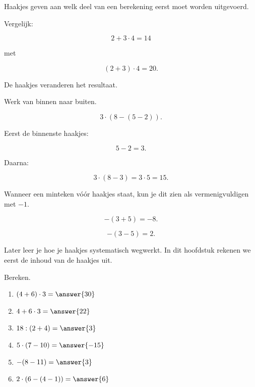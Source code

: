 \documentclass{ximera}
\begin{document}

Haakjes geven aan welk deel van een berekening eerst moet worden uitgevoerd.

\begin{example}
Vergelijk:

\[
2+3\cdot4=14
\]

met

\[
(2+3)\cdot4=20.
\]

De haakjes veranderen het resultaat.
\end{example}


Werk van binnen naar buiten.

\begin{example}
\[
3\cdot\left(8-(5-2)\right).
\]

Eerst de binnenste haakjes:

\[
5-2=3.
\]

Daarna:

\[
3\cdot(8-3)
=
3\cdot5
=
15.
\]
\end{example}


Wanneer een minteken vóór haakjes staat, kun je dit zien als vermenigvuldigen
met $-1$.

\[
-(3+5)=-8.
\]

\[
-(3-5)=2.
\]

Later leer je hoe je haakjes systematisch wegwerkt. In dit hoofdstuk rekenen we
eerst de inhoud van de haakjes uit.

\begin{exercise}
Bereken.

\begin{enumerate}
    \item $(4+6)\cdot3=\answer{30}$
    \item $4+6\cdot3=\answer{22}$
    \item $18:(2+4)=\answer{3}$
    \item $5\cdot(7-10)=\answer{-15}$
    \item $-(8-11)=\answer{3}$
    \item $2\cdot(6-(4-1))=\answer{6}$
\end{enumerate}
\end{exercise}

\end{document}
